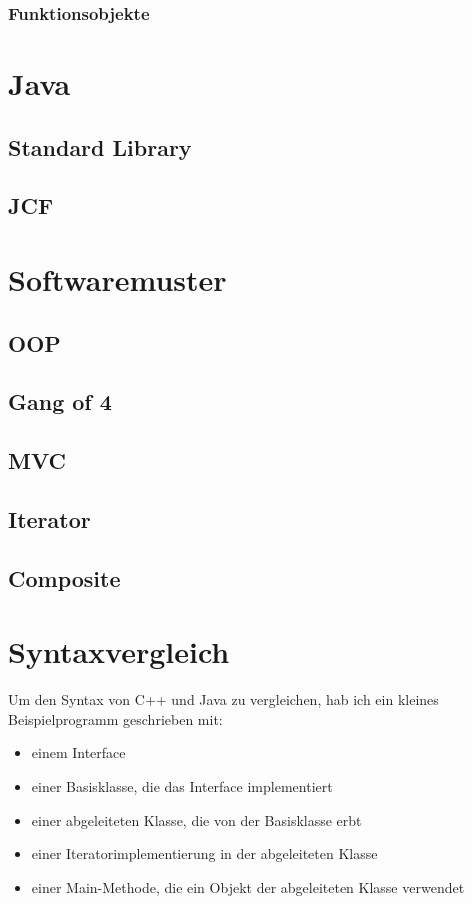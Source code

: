 \documentclass[12pt]{scrartcl}
\begin{document}
\subsubsection{Funktionsobjekte}

\pagebreak

\section{Java}
\subsection{Standard Library}
\subsection{JCF}
\section{Softwaremuster}
\subsection{OOP}
\subsection{Gang of 4}
\subsection{MVC}
\subsection{Iterator}
\subsection{Composite}

\pagebreak
\section{Syntaxvergleich}
Um den Syntax von C++ und Java zu vergleichen, hab ich ein kleines Beispielprogramm geschrieben mit:
\begin{itemize}
	\item einem Interface
	\item einer Basisklasse, die das Interface implementiert
	\item einer abgeleiteten Klasse, die von der Basisklasse erbt
	\item einer Iteratorimplementierung in der abgeleiteten Klasse
	\item einer Main-Methode, die ein Objekt der abgeleiteten Klasse verwendet
\end{itemize}
\end{document}
